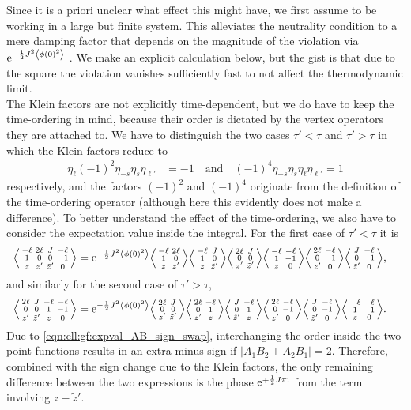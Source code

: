 Since it is a priori unclear what effect this might have, we first assume to be working in a large but finite system.
This alleviates the neutrality condition to a mere damping factor that depends on the magnitude of the violation via $\powe{-\frac{1}{2}J^2 \bra*{\phi(0)^2}}$ \cite[]{Gogolin_1999}.
We make an explicit calculation below, but the gist is that due to the square the violation vanishes sufficiently fast to not affect the thermodynamic limit.\\
The Klein factors are not explicitly time-dependent, but we do have to keep the time-ordering in mind, because their order is dictated by the vertex operators they are attached to. 
We have to distinguish the two cases $\tau'<\tau$ and $\tau'>\tau$ in which the Klein factors reduce to
\begin{align*}
\eta_\ell (-1)^2 \eta_{-s} \eta_{s} \eta_{\ell'} &= -1\quad\text{and}\quad (-1)^4 \eta_{-s} \eta_{s} \eta_{\ell} \eta_{\ell'} = 1
\end{align*}
respectively, and the factors $(-1)^2$ and $(-1)^4$ originate from the definition of the time-ordering operator (although here this evidently does not make a difference).
To better understand the effect of the time-ordering, we also have to consider the expectation value inside the integral.
For the first case of $\tau'<\tau$ it is
\begin{align*}
\bra*{\abx{-\ell&2\ell&J&-\ell}{1&0&0&-1}{z&z'&\tilde{z}'&0}} &= \powe{-\frac{1}{2}J^2 \bra*{\phi(0)^2}} \bra*{\abx{-\ell&2\ell}{1&0}{z&z'}} \bra*{\abx{-\ell&J}{1&0}{z&\tilde{z}'}} \bra*{\abx{2\ell&J}{0&0}{z'&\tilde{z}'}} \bra*{\abx{-\ell&-\ell}{1&-1}{z&0}} \bra*{\abx{2\ell&-\ell}{0&-1}{z'&0}} \bra*{\abx{J&-\ell}{0&-1}{\tilde{z}'&0}},
\end{align*}
and similarly for the second case of $\tau'>\tau$,
\begin{align*}
\bra*{\abx{2\ell&J&-\ell&-\ell}{0&0&1&-1}{z'&\tilde{z}'&z&0}} &= \powe{-\frac{1}{2}J^2 \bra*{\phi(0)^2}} \bra*{\abx{2\ell&J}{0&0}{z'&\tilde{z}'}} \bra*{\abx{2\ell&-\ell}{0&1}{z'&z}} \bra*{\abx{J&-\ell}{0&1}{\tilde{z}'&z}} \bra*{\abx{2\ell&-\ell}{0&-1}{z'&0}} \bra*{\abx{J&-\ell}{0&-1}{\tilde{z}'&0}} \bra*{\abx{-\ell&-\ell}{1&-1}{z&0}}.
\end{align*}
Due to \autoref{eqn:ell:gf:expval_AB_sign_swap}, interchanging the order inside the two-point functions results in an extra minus sign if $|A_1B_2 + A_2B_1| = 2$.
Therefore, combined with the sign change due to the Klein factors, the only remaining difference between the two expressions is the phase $\powe{\mp \frac{1}{2} J\pi \i}$ from the term involving $z-\tilde{z}'$.
